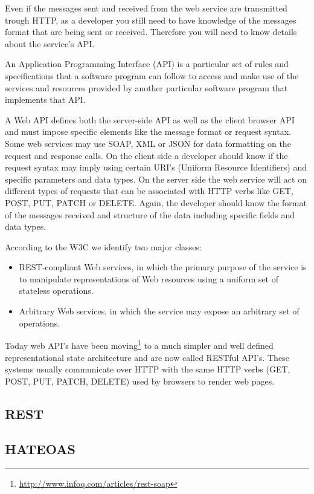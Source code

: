 Even if the messages sent and received from the web service are transmitted trough HTTP, as a developer you still need to have knowledge of the messages format that are being sent or received. Therefore you will need to know details about the service's API.

An Application Programming Interface (API) is a particular
set of rules and specifications that a software program can follow to access and make use of the services
and resources provided by another particular software program that implements that API.

A Web API defines both the server-side API as well as the client browser API and must impose specific elements like the message format or request syntax. Some web services may use SOAP, XML or JSON for data formatting on the request and response calls. On the client side a developer should know if the request syntax may imply using certain URI's (Uniform Resource Identifiers) and specific parameters and data types. On the server side the web service will act on different types of requests that can be associated with HTTP verbs like GET, POST, PUT, PATCH or DELETE. Again, the developer should know the format of the messages received and structure of the data including specific fields and data types.

According to the W3C \cite{W3C} we identify two major classes:
\begin{itemize}
	\item REST-compliant Web services, in which the primary purpose of the service is to manipulate representations of Web resources using a uniform set of stateless operations.
	\item Arbitrary Web services, in which the service may expose an arbitrary set of operations. 
\end{itemize}

Today web API's have been moving\footnote{\url{http://www.infoq.com/articles/rest-soap}} to a much simpler and well defined representational state architecture and are now called RESTful API's. These systems usually communicate over HTTP with the same HTTP verbs (GET, POST, PUT, PATCH, DELETE) used by browsers to render web pages.

\subsection{REST}
\label{sub-sec:rest}


\subsection{HATEOAS}
\label{sub-sec:hateoas}

